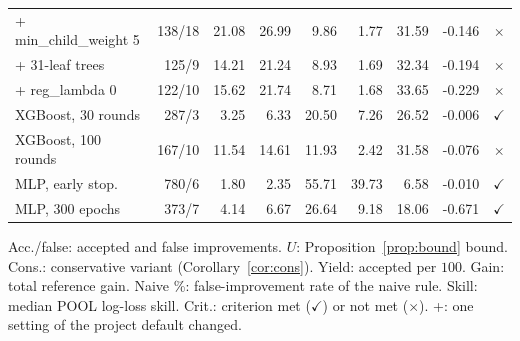 \begin{table}[!htb]
\begin{tabular}{@{}lrrrrrrrc@{}}
+ min\_child\_weight 5 & 138/18 & 21.08 & 26.99 & 9.86 & 1.77 & 31.59 & -0.146 & $\times$ \\
+ 31-leaf trees & 125/9 & 14.21 & 21.24 & 8.93 & 1.69 & 32.34 & -0.194 & $\times$ \\
+ reg\_lambda 0 & 122/10 & 15.62 & 21.74 & 8.71 & 1.68 & 33.65 & -0.229 & $\times$ \\
XGBoost, 30 rounds & 287/3 & 3.25 & 6.33 & 20.50 & 7.26 & 26.52 & -0.006 & $\checkmark$ \\
XGBoost, 100 rounds & 167/10 & 11.54 & 14.61 & 11.93 & 2.42 & 31.58 & -0.076 & $\times$ \\
MLP, early stop. & 780/6 & 1.80 & 2.35 & 55.71 & 39.73 & 6.58 & -0.010 & $\checkmark$ \\
MLP, 300 epochs & 373/7 & 4.14 & 6.67 & 26.64 & 9.18 & 18.06 & -0.671 & $\checkmark$ \\
\bottomrule
\end{tabular}

\vspace{2pt}
\parbox{\linewidth}{\justifying\scriptsize *Acc./false: accepted and false improvements. $U$: Proposition~\ref{prop:bound} bound. Cons.: conservative variant (Corollary~\ref{cor:cons}). Yield: accepted per $100$. Gain: total reference gain. Naive \%: false-improvement rate of the naive rule. Skill: median POOL log-loss skill. Crit.: criterion met ($\checkmark$) or not met ($\times$). +: one setting of the project default changed.}
\end{table}
